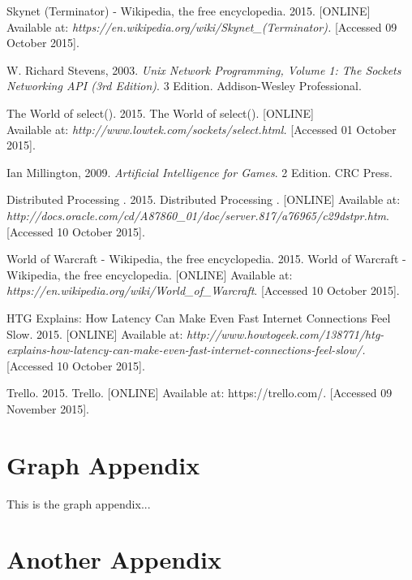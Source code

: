 \documentclass[12pt,a4paper,titlepage]{article}
\begin{document}
\begin{thebibliography}{99}

Skynet (Terminator) - Wikipedia, the free encyclopedia. 2015. [ONLINE] Available at: \textit{https://en.wikipedia.org/wiki/Skynet\_(Terminator).} [Accessed 09 October 2015].

W. Richard Stevens, 2003. \textit{Unix Network Programming, Volume 1: The Sockets Networking API (3rd Edition)}. 3 Edition. Addison-Wesley Professional.

The World of select(). 2015. The World of select(). [ONLINE] \\
Available at: \textit{http://www.lowtek.com/sockets/select.html.} [Accessed 01 October 2015].

Ian Millington, 2009. \textit{Artificial Intelligence for Games}. 2 Edition. CRC Press.

Distributed Processing . 2015. Distributed Processing . [ONLINE] Available at: \textit{http://docs.oracle.com/cd/A87860\_01/doc/server.817/a76965/c29dstpr.htm}. [Accessed 10 October 2015].

World of Warcraft - Wikipedia, the free encyclopedia. 2015. World of Warcraft - Wikipedia, the free encyclopedia. [ONLINE] Available at: \textit{https://en.wikipedia.org/wiki/World\_of\_Warcraft}. [Accessed 10 October 2015].

HTG Explains: How Latency Can Make Even Fast Internet Connections Feel Slow. 2015. [ONLINE] Available at: \textit{http://www.howtogeek.com/138771/htg-explains-how-latency-can-make-even-fast-internet-connections-feel-slow/.} [Accessed 10 October 2015].

Trello. 2015. Trello. [ONLINE] Available at: https://trello.com/. [Accessed 09 November 2015].

\end{thebibliography}



\newpage
\begin{appendices}

\section{Graph Appendix}
\label{appendix:graph}
This is the graph appendix...

\section{Another Appendix}

\end{appendices}
\end{document}
